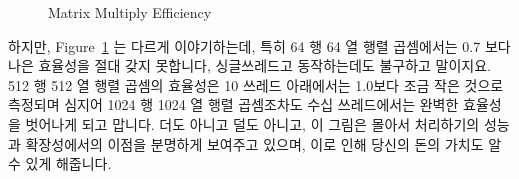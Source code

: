 \begin{figure}[tbp]
\centering
{}
\caption{Matrix Multiply Efficiency}
\label{fig:SMPdesign:Matrix Multiply Efficiency}
\end{figure}

하지만,
Figure~\ref{fig:SMPdesign:Matrix Multiply Efficiency} 는 다르게 이야기하는데,
특히 64 행 64 열 행렬 곱셈에서는 0.7 보다 나은 효율성을 절대 갖지 못합니다,
싱글쓰레드고 동작하는데도 불구하고 말이지요.
512 행 512 열 행렬 곱셈의 효율성은 10 쓰레드 아래에서는 1.0보다 조금 작은
것으로 측정되며 심지어 1024 행 1024 열 행렬 곱셈조차도 수십 쓰레드에서는 완벽한
효율성을 벗어나게 되고 맙니다.
더도 아니고 덜도 아니고, 이 그림은 몰아서 처리하기의 성능과 확장성에서의 이점을
분명하게 보여주고 있으며, 이로 인해 당신의 돈의 가치도 알 수 있게 해줍니다.

